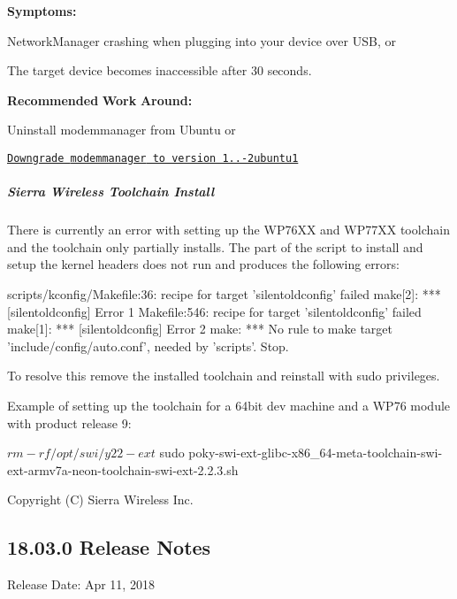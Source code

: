 {\bfseries Symptoms\+:} 
\begin{DoxyItemize}
\item Network\+Manager crashing when plugging into your device over U\+SB, or
\item The target device becomes inaccessible after 30 seconds.
\end{DoxyItemize}

{\bfseries Recommended} {\bfseries Work} {\bfseries Around\+:} 
\begin{DoxyItemize}
\item Uninstall {\ttfamily modemmanager} from Ubuntu or
\item \href{http://packages.ubuntu.com/trusty/modemmanager}{\tt Downgrade {\ttfamily modemmanager} to version 1..-\/2ubuntu1}
\end{DoxyItemize}\hypertarget{releaseNotes18040_rn1804_ConstraintsTC}{}\subparagraph{Sierra Wireless Toolchain Install}\label{releaseNotes18040_rn1804_ConstraintsTC}
There is currently an error with setting up the W\+P76\+XX and W\+P77\+XX toolchain and the toolchain only partially installs. The part of the script to install and setup the kernel headers does not run and produces the following errors\+:

\begin{DoxyVerb}scripts/kconfig/Makefile:36: recipe for target 'silentoldconfig' failed
make[2]: *** [silentoldconfig] Error 1
Makefile:546: recipe for target 'silentoldconfig' failed
make[1]: *** [silentoldconfig] Error 2
make: *** No rule to make target 'include/config/auto.conf', needed by 'scripts'.  Stop.
\end{DoxyVerb}


To resolve this remove the installed toolchain and reinstall with {\ttfamily sudo} privileges.

Example of setting up the toolchain for a 64bit dev machine and a W\+P76 module with product release 9\+: \begin{DoxyVerb}$ rm -rf /opt/swi/y22-ext
$ sudo poky-swi-ext-glibc-x86_64-meta-toolchain-swi-ext-armv7a-neon-toolchain-swi-ext-2.2.3.sh
\end{DoxyVerb}


Copyright (C) Sierra Wireless Inc. \hypertarget{releaseNotes18030}{}\subsection{18.03.0 Release Notes}\label{releaseNotes18030}
Release Date\+: Apr 11, 2018

